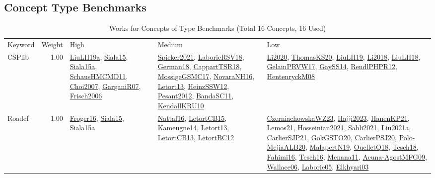 \subsection{Concept Type Benchmarks}
\label{sec:Benchmarks}
\label{Benchmarks}
{\scriptsize
\begin{longtable}{p{3cm}r>{\raggedright\arraybackslash}p{6cm}>{\raggedright\arraybackslash}p{6cm}>{\raggedright\arraybackslash}p{8cm}}
\rowcolor{white}\caption{Works for Concepts of Type Benchmarks (Total 16 Concepts, 16 Used)}\\ \toprule
\rowcolor{white}Keyword & Weight & High & Medium & Low\\ \midrule\endhead
\bottomrule
\endfoot
\index{CSPlib}\index{Benchmarks!CSPlib}CSPlib &  1.00 & \hyperref[detail:LiuLH19a]{LiuLH19a}, \hyperref[detail:Siala15]{Siala15}, \hyperref[detail:Siala15a]{Siala15a}, \hyperref[detail:SchausHMCMD11]{SchausHMCMD11}, \hyperref[detail:Choi2007]{Choi2007}, \hyperref[detail:GarganiR07]{GarganiR07}, \hyperref[detail:Frisch2006]{Frisch2006} & \hyperref[detail:Spieker2021]{Spieker2021}, \hyperref[detail:LaborieRSV18]{LaborieRSV18}, \hyperref[detail:German18]{German18}, \hyperref[detail:CappartTSR18]{CappartTSR18}, \hyperref[detail:MossigeGSMC17]{MossigeGSMC17}, \hyperref[detail:NovaraNH16]{NovaraNH16}, \hyperref[detail:Letort13]{Letort13}, \hyperref[detail:HeinzSSW12]{HeinzSSW12}, \hyperref[detail:Pesant2012]{Pesant2012}, \hyperref[detail:BandaSC11]{BandaSC11}, \hyperref[detail:KendallKRU10]{KendallKRU10} & \hyperref[detail:Li2020]{Li2020}, \hyperref[detail:ThomasKS20]{ThomasKS20}, \hyperref[detail:LiuLH19]{LiuLH19}, \hyperref[detail:Li2018]{Li2018}, \hyperref[detail:LiuLH18]{LiuLH18}, \hyperref[detail:GelainPRVW17]{GelainPRVW17}, \hyperref[detail:GaySS14]{GaySS14}, \hyperref[detail:RendlPHPR12]{RendlPHPR12}, \hyperref[detail:HentenryckM08]{HentenryckM08}\\
\index{Roadef}\index{Benchmarks!Roadef}Roadef &  1.00 & \hyperref[detail:Froger16]{Froger16}, \hyperref[detail:Siala15]{Siala15}, \hyperref[detail:Siala15a]{Siala15a} & \hyperref[detail:Nattaf16]{Nattaf16}, \hyperref[detail:LetortCB15]{LetortCB15}, \hyperref[detail:Kameugne14]{Kameugne14}, \hyperref[detail:Letort13]{Letort13}, \hyperref[detail:LetortCB13]{LetortCB13}, \hyperref[detail:LetortBC12]{LetortBC12} & \hyperref[detail:CzerniachowskaWZ23]{CzerniachowskaWZ23}, \hyperref[detail:Hajji2023]{Hajji2023}, \hyperref[detail:HanenKP21]{HanenKP21}, \hyperref[detail:Lemos21]{Lemos21}, \hyperref[detail:Hosseinian2021]{Hosseinian2021}, \hyperref[detail:Sahli2021]{Sahli2021}, \hyperref[detail:Liu2021a]{Liu2021a}, \hyperref[detail:CarlierSJP21]{CarlierSJP21}, \hyperref[detail:GokGSTO20]{GokGSTO20}, \hyperref[detail:CarlierPSJ20]{CarlierPSJ20}, \hyperref[detail:Polo-MejiaALB20]{Polo-MejiaALB20}, \hyperref[detail:MalapertN19]{MalapertN19}, \hyperref[detail:OuelletQ18]{OuelletQ18}, \hyperref[detail:Tesch18]{Tesch18}, \hyperref[detail:Fahimi16]{Fahimi16}, \hyperref[detail:Tesch16]{Tesch16}, \hyperref[detail:Menana11]{Menana11}, \hyperref[detail:Acuna-AgostMFG09]{Acuna-AgostMFG09}, \hyperref[detail:Wallace06]{Wallace06}, \hyperref[detail:Laborie05]{Laborie05}, \hyperref[detail:Elkhyari03]{Elkhyari03}\\

\end{longtable}}
